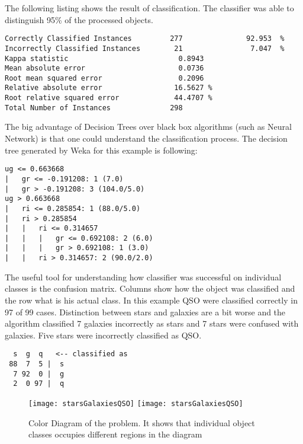 The following listing shows the result of classification. The
classifier was able to distinguish 95\% of the processed objects.



\begin{lstlisting}
Correctly Classified Instances         277               92.953  %
Incorrectly Classified Instances        21                7.047  %
Kappa statistic                          0.8943
Mean absolute error                      0.0736
Root mean squared error                  0.2096
Relative absolute error                 16.5627 %
Root relative squared error             44.4707 %
Total Number of Instances              298
\end{lstlisting}

The big advantage of Decision Trees over black box algorithms (such as
Neural Network) is that one could understand the classification
process. The decision tree generated by Weka for this example is
following:

\begin{lstlisting}
ug <= 0.663668
|   gr <= -0.191208: 1 (7.0)
|   gr > -0.191208: 3 (104.0/5.0)
ug > 0.663668
|   ri <= 0.285854: 1 (88.0/5.0)
|   ri > 0.285854
|   |   ri <= 0.314657
|   |   |   gr <= 0.692108: 2 (6.0)
|   |   |   gr > 0.692108: 1 (3.0)
|   |   ri > 0.314657: 2 (90.0/2.0)
\end{lstlisting}

The useful tool for understanding how classifier was successful on
individual classes is the confusion matrix. Columns show how the
object was classified and the row what is his actual class. In this
example QSO were classified correctly in 97 of 99 cases. Distinction
between stars and galaxies are a bit worse and the algorithm
classified 7 galaxies incorrectly as stars and 7 stars were confused
with galaxies. Five stars were incorrectly classified as QSO.
 
\begin{lstlisting}
  s  g  q   <-- classified as
 88  7  5 |  s
  7 92  0 |  g
  2  0 97 |  q
\end{lstlisting}
 
\begin{figure}[!htbp]
        \leavevmode
        \ifpdf
        \texttt{[image: starsGalaxiesQSO]}
        \else
        \texttt{[image: starsGalaxiesQSO]}
        \fi
        \caption{Color Diagram of the problem. It shows that individual
          object classes occupies different regions in the diagram }
        \label{FigStarsGalaxiesQSO}
\end{figure}

